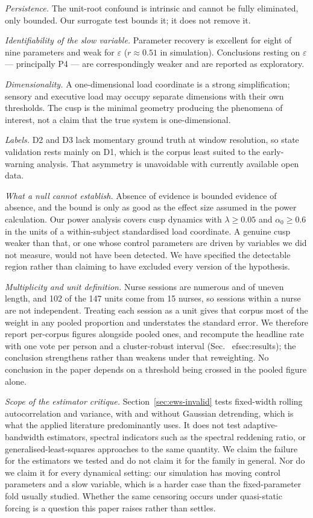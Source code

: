 \documentclass[conference]{IEEEtran}
\begin{document}
\emph{Persistence.} The unit-root confound is intrinsic and cannot be fully
eliminated, only bounded. Our surrogate test bounds it; it does not remove it.

\emph{Identifiability of the slow variable.} Parameter recovery is excellent
for eight of nine parameters and weak for $\varepsilon$ ($r\approx0.51$ in
simulation). Conclusions resting on $\varepsilon$ --- principally P4 --- are
correspondingly weaker and are reported as exploratory.

\emph{Dimensionality.} A one-dimensional load coordinate is a strong
simplification; sensory and executive load may occupy separate dimensions with
their own thresholds. The cusp is the minimal geometry producing the phenomena
of interest, not a claim that the true system is one-dimensional.

\emph{Labels.} D2 and D3 lack momentary ground truth at window resolution, so
state validation rests mainly on D1, which is the corpus least suited to the
early-warning analysis. That asymmetry is unavoidable with currently available
open data.

\emph{What a null cannot establish.} Absence of evidence is bounded evidence of
absence, and the bound is only as good as the effect size assumed in the power
calculation. Our power analysis covers cusp dynamics with $\lambda\ge0.05$ and
$\alpha_0\ge0.6$ in the units of a within-subject standardised load
coordinate. A genuine cusp weaker than that, or one whose control parameters
are driven by variables we did not measure, would not have been detected. We
have specified the detectable region rather than claiming to have excluded
every version of the hypothesis.

\emph{Multiplicity and unit definition.} Nurse sessions are numerous and of
uneven length, and 102 of the 147 units come from 15 nurses, so sessions within
a nurse are not independent. Treating each session as a unit gives that corpus
most of the weight in any pooled proportion and understates the standard error.
We therefore report per-corpus figures alongside pooled ones, and recompute the
headline rate with one vote per person and a cluster-robust interval
(Sec.~
ef{sec:results}); the conclusion strengthens rather than weakens under
that reweighting. No conclusion in the paper depends on a threshold being
crossed in the pooled figure alone.

\emph{Scope of the estimator critique.} Section~\ref{sec:ews-invalid} tests
fixed-width rolling autocorrelation and variance, with and without Gaussian
detrending, which is what the applied literature predominantly uses. It does
not test adaptive-bandwidth estimators, spectral indicators such as the
spectral reddening ratio, or generalised-least-squares approaches to the same
quantity. We claim the failure for the estimators we tested and do not claim it
for the family in general. Nor do we claim it for every dynamical setting: our
simulation has moving control parameters and a slow variable, which is a harder
case than the fixed-parameter fold usually studied. Whether the same censoring
occurs under quasi-static forcing is a question this paper raises rather than
settles.
\end{document}
